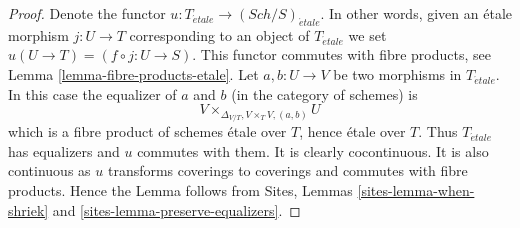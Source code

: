 \documentclass[10pt,a4paper]{amsart}
\theoremstyle{plain}
\theoremstyle{definition}
\theoremstyle{remark}
\numberwithin{equation}{subsection}
\def\Sch{\mathit{Sch}}
\def\etale{{\acute{e}tale}}
\begin{document}
\begin{proof}
Denote the functor $u : T_\etale \to (\Sch/S)_\etale$.
In other words, given an \'etale morphism $j : U \to T$ corresponding
to an object of $T_\etale$ we set $u(U \to T) = (f \circ j : U \to S)$.
This functor commutes with fibre products, see
Lemma \ref{lemma-fibre-products-etale}.
Let $a, b : U \to V$ be two morphisms in $T_\etale$.
In this case the equalizer of $a$ and $b$ (in the category of schemes) is
$$
V \times_{\Delta_{V/T}, V \times_T V, (a, b)} U
$$
which is a fibre product of schemes \'etale over $T$, hence \'etale
over $T$. Thus $T_\etale$ has equalizers and $u$ commutes with them.
It is clearly cocontinuous.
It is also continuous as $u$ transforms coverings to coverings and
commutes with fibre products. Hence the Lemma follows from
Sites, Lemmas \ref{sites-lemma-when-shriek}
and \ref{sites-lemma-preserve-equalizers}.
\end{proof}
\end{document}
